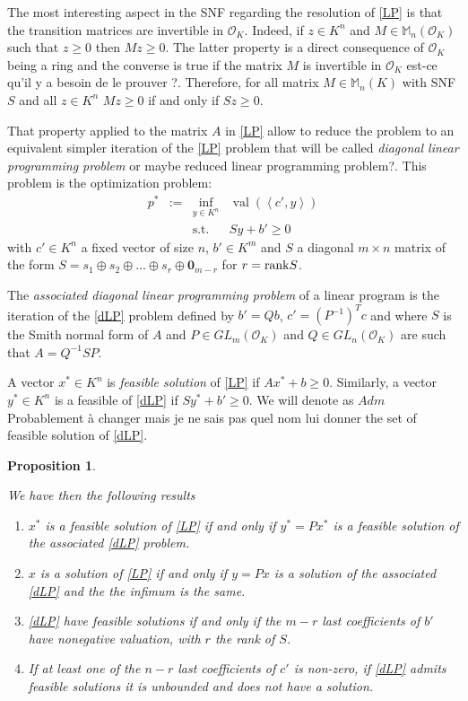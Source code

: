\documentclass[a4paper,12pt]{article}
\newtheorem{proposition}{Proposition}
\newcommand{\allmat}{\mathbb{M}} %
\newcommand{\corentin}[1]{{\color{red} #1}} %
\DeclareMathOperator{\val}{val}
\newcommand{\OK}{\mathcal{O}_K}
\begin{document}
The most interesting aspect in the SNF regarding the resolution of \ref{LP} is that the transition matrices are invertible in $\OK$. Indeed, if $z \in K^n$ and $M \in \allmat_n(\OK)$ such that $z \geq 0$ then $Mz \geq 0$. The latter property is a direct consequence of $\OK$ being a ring and the converse is true if the matrix $M$ is invertible in $\OK$ \corentin{est-ce qu'il y a besoin de le prouver ?}. Therefore, for all matrix $M \in \allmat_n(K)$ with SNF $S$ and all $z \in K^n$ $Mz \geq 0$ if and only if $Sz \geq 0$. 

That property applied to the matrix $A$ in \ref{LP} allow to reduce the problem to an equivalent simpler iteration of the \ref{LP} problem that will be called {\it diagonal linear programming problem} \corentin{or maybe reduced linear programming problem?}. This problem is the optimization problem: 
\begin{equation}
  \tag{dLP}\label{dLP}
\begin{array}{rcll}
  p^* & := & \inf_{y \in K^n} & \val(\left\langle c', y \right\rangle) \\
  &    & \text{s.t.}         & S y + b' \geq 0
\end{array}
\end{equation}
with $c' \in K^n$ a fixed vector of size $n$, $b' \in K^m$ and $S$ a diagonal $m \times n$ matrix of the form $S = s_1 \oplus s_2 \oplus \ldots \oplus s_r \oplus { \bm 0}_{m-r} $ for $r={\rm rank} S$.

The {\it associated diagonal linear programming problem} of a linear program is the iteration of the \ref{dLP} problem defined by $b' = Qb$, $c' = \left(P^{-1}\right)^T c$ and where $S$ is the Smith normal form of $A$ and $P \in GL_m\left( \OK \right)$ and $ Q \in GL_n\left( \OK \right)$ are such that $A = Q^{-1} S P$.

A vector $x^* \in K^n$ is {\it feasible solution} of \ref{LP} if $Ax^* + b \geq 0$. Similarly, a vector $y^* \in K^n$ is a feasible of \ref{dLP} if $Sy^*+b' \geq 0$. We will denote as $Adm$ \corentin{Probablement à changer mais je ne sais pas quel nom lui donner} the set of feasible solution of \ref{dLP}.

\begin{proposition}\label{prop:reduc}
	
	We have then the following results
	\begin{enumerate}
		\item $x^*$ is a feasible solution of \ref{LP} if and only if $y^* = P x^*$ is a feasible solution of the associated \ref{dLP} problem.
		\item $x$ is a solution of \ref{LP} if and only if $y = P x$ is a solution of the associated \ref{dLP} and the the infimum is the same.
		\item \ref{dLP} have feasible solutions if and only if the $m-r$ last coefficients of $b'$ have nonegative valuation, with $r$ the rank of $S$.
		\item If at least one of the $n-r$ last coefficients of $c'$ is non-zero, if \ref{dLP} admits feasible solutions it is unbounded and does not have a solution.
		 
  \end{enumerate}
\end{proposition}
	
\end{document}

